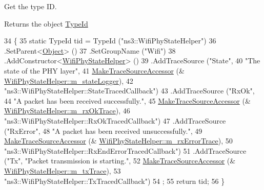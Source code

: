 Get the type ID. 

\begin{DoxyReturn}{Returns}
the object \hyperlink{classns3_1_1TypeId}{Type\+Id} 
\end{DoxyReturn}

\begin{DoxyCode}
34 \{
35   \textcolor{keyword}{static} TypeId tid = TypeId (\textcolor{stringliteral}{"ns3::WifiPhyStateHelper"})
36     .SetParent<\hyperlink{classns3_1_1Object_a40860402e64d8008fb42329df7097cdb}{Object}> ()
37     .SetGroupName (\textcolor{stringliteral}{"Wifi"})
38     .AddConstructor<\hyperlink{classns3_1_1WifiPhyStateHelper_a349813aadfc35ffdfb50860a276b6ad8}{WifiPhyStateHelper}> ()
39     .AddTraceSource (\textcolor{stringliteral}{"State"},
40                      \textcolor{stringliteral}{"The state of the PHY layer"},
41                      \hyperlink{group__tracing_gab21a770b9855af4e8f69f7531ea4a6b0}{MakeTraceSourceAccessor} (&
      \hyperlink{classns3_1_1WifiPhyStateHelper_a5a88d96547b35744255e922440ff525d}{WifiPhyStateHelper::m\_stateLogger}),
42                      \textcolor{stringliteral}{"ns3::WifiPhyStateHelper::StateTracedCallback"})
43     .AddTraceSource (\textcolor{stringliteral}{"RxOk"},
44                      \textcolor{stringliteral}{"A packet has been received successfully."},
45                      \hyperlink{group__tracing_gab21a770b9855af4e8f69f7531ea4a6b0}{MakeTraceSourceAccessor} (&
      \hyperlink{classns3_1_1WifiPhyStateHelper_a97095d8d63198458c97879945be8c013}{WifiPhyStateHelper::m\_rxOkTrace}),
46                      \textcolor{stringliteral}{"ns3::WifiPhyStateHelper::RxOkTracedCallback"})
47     .AddTraceSource (\textcolor{stringliteral}{"RxError"},
48                      \textcolor{stringliteral}{"A packet has been received unsuccessfully."},
49                      \hyperlink{group__tracing_gab21a770b9855af4e8f69f7531ea4a6b0}{MakeTraceSourceAccessor} (&
      \hyperlink{classns3_1_1WifiPhyStateHelper_ab82112241adc383713faaf87df97e894}{WifiPhyStateHelper::m\_rxErrorTrace}),
50                      \textcolor{stringliteral}{"ns3::WifiPhyStateHelper::RxEndErrorTracedCallback"})
51     .AddTraceSource (\textcolor{stringliteral}{"Tx"}, \textcolor{stringliteral}{"Packet transmission is starting."},
52                      \hyperlink{group__tracing_gab21a770b9855af4e8f69f7531ea4a6b0}{MakeTraceSourceAccessor} (&
      \hyperlink{classns3_1_1WifiPhyStateHelper_a5e1f9dd965eb7d83ffd469c15e54364b}{WifiPhyStateHelper::m\_txTrace}),
53                      \textcolor{stringliteral}{"ns3::WifiPhyStateHelper::TxTracedCallback"})
54   ;
55   \textcolor{keywordflow}{return} tid;
56 \}
\end{DoxyCode}


